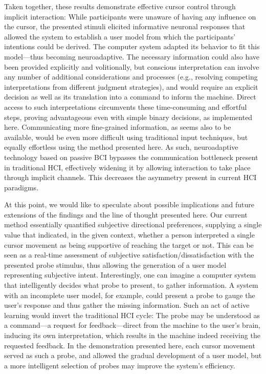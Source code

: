 Taken together, these results demonstrate effective cursor control through implicit interaction: While participants were unaware of having any influence on the cursor, the presented stimuli elicited informative neuronal responses that allowed the system to establish a user model from which the participants' intentions could be derived. The computer system adapted its behavior to fit this model---thus becoming neuroadaptive. The necessary information could also have been provided explicitly and volitionally, but conscious interpretation can involve any number of additional considerations and processes (e.g., resolving competing interpretations from different judgment strategies), and would require an explicit decision as well as its translation into a command to inform the machine. Direct access to such interpretations circumvents these time-consuming and effortful steps, proving advantageous even with simple binary decisions, as implemented here. Communicating more fine-grained information, as seems also to be available, would be even more difficult using traditional input techniques, but equally effortless using the method presented here. As such, neuroadaptive technology based on passive BCI bypasses the communication bottleneck present in traditional HCI, effectively widening it by allowing interaction to take place through implicit channels. This decreases the asymmetry present in current HCI paradigms.

At this point, we would like to speculate about possible implications and future extensions of the findings and the line of thought presented here. Our current method essentially quantified subjective directional preferences, supplying a single value that indicated, in the given context, whether a person interpreted a single cursor movement as being supportive of reaching the target or not. This can be seen as a real-time assessment of subjective satisfaction/dissatisfaction with the presented probe stimulus, thus allowing the generation of a user model representing subjective intent. Interestingly, one can imagine a computer system that intelligently decides what probe to present, to gather information. A system with an incomplete user model, for example, could present a probe to gauge the user's response and thus gather the missing information. Such an act of active learning \cite{settles2009activelearning} would invert the traditional HCI cycle: The probe may be understood as a command---a request for feedback---direct from the machine to the user's brain, inducing its own interpretation, which results in the machine indeed receiving the requested feedback. In the demonstration presented here, each cursor movement served as such a probe, and allowed the gradual development of a user model, but a more intelligent selection of probes may improve the system's efficiency.

